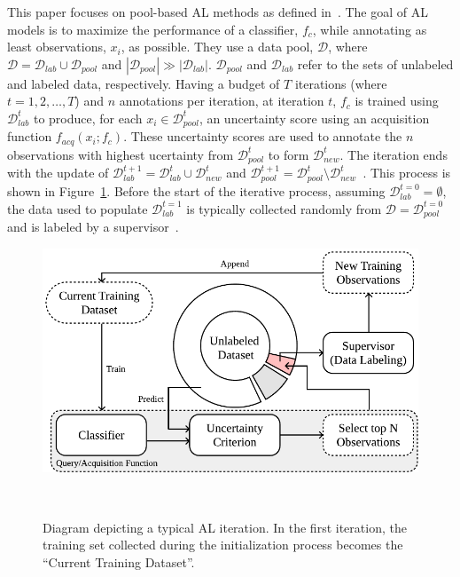 This paper focuses on pool-based AL methods as defined
in~\cite{katz2021improved}. The goal of AL models is to maximize the
performance of a classifier, $f_{c}$, while annotating as least
observations, $x_i$, as possible. They use a data pool, $\mathcal{D}$, where
$\mathcal{D} = \mathcal{D}_{lab} \cup \mathcal{D}_{pool}$ and
$|\mathcal{D}_{pool}| \gg |\mathcal{D}_{lab}|$. $\mathcal{D}_{pool}$ and
$\mathcal{D}_{lab}$ refer to the sets of unlabeled and labeled data,
respectively. Having a budget of $T$ iterations (where $t = 1, 2, \ldots, T$)
and $n$ annotations per iteration, at iteration $t$, $f_c$ is trained using
$\mathcal{D}_{lab}^t$ to produce, for each $x_i \in \mathcal{D}_{pool}^t$, an
uncertainty score using an acquisition function $f_{acq}(x_i;f_c)$. These
uncertainty scores are used to annotate the $n$
observations with highest ucertainty from $\mathcal{D}_{pool}^t$ to form
$\mathcal{D}_{new}^t$. The iteration ends with the update of
$\mathcal{D}_{lab}^{t+1} = \mathcal{D}_{lab}^t \cup \mathcal{D}_{new}^t$ and
$\mathcal{D}_{pool}^{t+1} = \mathcal{D}_{pool}^t \setminus
\mathcal{D}_{new}^t$~\cite{Su2020, Sverchkov2017}. This
process is shown in Figure~\ref{fig:al_iteration}. Before the start of
the iterative process, assuming $\mathcal{D}_{lab}^{t=0} = \emptyset$, the
data used to populate $\mathcal{D}_{lab}^{t=1}$ is typically collected
randomly from $\mathcal{D} = \mathcal{D}_{pool}^{t=0}$ and is labeled by a
supervisor~\cite{Fonseca2021al, Yoo2019, Aghdam2019}. 

\begin{figure}
	\centering
	\includegraphics[width=.75\linewidth]{al_iteration}
    \caption[Diagram depicting a typical AL iteration.]{%
        Diagram depicting a typical AL iteration. In the first iteration, the
        training set collected during the initialization process becomes the
        ``Current Training Dataset''.
    }~\label{fig:al_iteration}
\end{figure}

